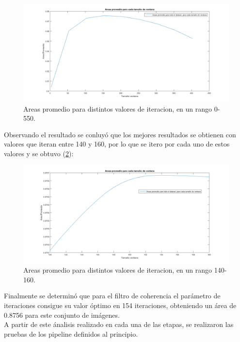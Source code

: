\begin{figure}[H]
	{
	\centering
	\includegraphics[width=1\textwidth]{Figures/CoherenciaRangoGrande}
	\caption[An Electron]{Areas promedio para distintos valores de iteracion, en un rango 0-550.}
	\label{fig:coherencia}
	}
\end{figure}

Observando el resultado se conluy\'o que los mejores resultados se obtienen con valores que iteran entre 140 y 160, por lo que se itero por cada uno de estos valores y se obtuvo (\ref{fig:coherenciaRangoChico}):

\begin{figure}[H]
	{
	\centering
	\includegraphics[width=1\textwidth]{Figures/CoherenciaRangoChico}
	\caption[An Electron]{Areas promedio para distintos valores de iteracion, en un rango 140-160.}
	\label{fig:coherenciaRangoChico}
	}
	\end{figure}

Finalmente se determin\'o que para el filtro de coherencia el parámetro de iteraciones consigue su valor \'optimo en 154 iteraciones, obteniendo un área de 0.8756 para este conjunto de im\'agenes.\\

A partir de este  \'analisis realizado en cada una de las etapas, se realizaron las pruebas de los pipeline definidos al principio. 


